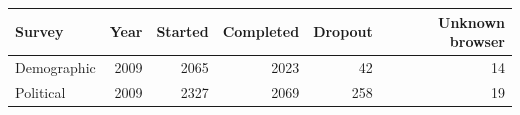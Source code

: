 \begin{tabular}{lrrrrr}
\toprule
Survey & Year & Started & Completed & Dropout & Unknown browser \\
\midrule
Demographic & 2009 & 2065 & 2023 &  42 & 14 \\
Political & 2009 & 2327 & 2069 & 258 & 19 \\
\bottomrule
\end{tabular}

